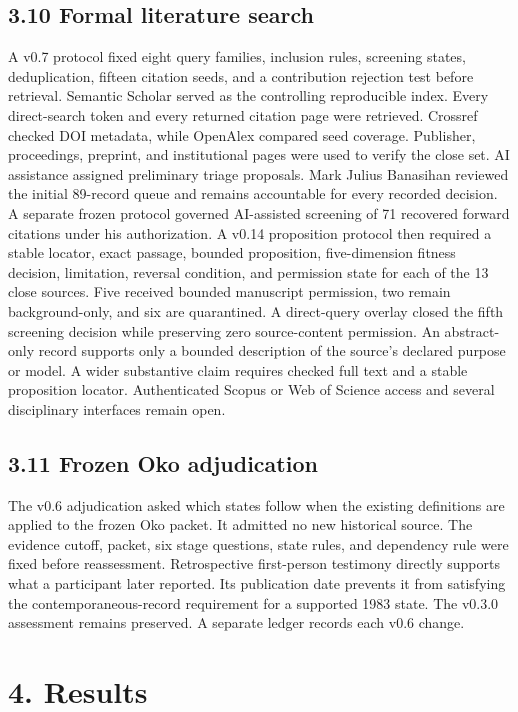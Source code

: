 \documentclass[11pt]{article}
\begin{document}
\subsection*{3.10 Formal literature search}
A v0.7 protocol fixed eight query families, inclusion rules, screening states, deduplication, fifteen citation seeds, and a contribution rejection test before retrieval. Semantic Scholar served as the controlling reproducible index. Every direct-search token and every returned citation page were retrieved. Crossref checked DOI metadata, while OpenAlex compared seed coverage. Publisher, proceedings, preprint, and institutional pages were used to verify the close set.
AI assistance assigned preliminary triage proposals. Mark Julius Banasihan reviewed the initial 89-record queue and remains accountable for every recorded decision. A separate frozen protocol governed AI-assisted screening of 71 recovered forward citations under his authorization. A v0.14 proposition protocol then required a stable locator, exact passage, bounded proposition, five-dimension fitness decision, limitation, reversal condition, and permission state for each of the 13 close sources. Five received bounded manuscript permission, two remain background-only, and six are quarantined. A direct-query overlay closed the fifth screening decision while preserving zero source-content permission. An abstract-only record supports only a bounded description of the source's declared purpose or model. A wider substantive claim requires checked full text and a stable proposition locator. Authenticated Scopus or Web of Science access and several disciplinary interfaces remain open.
\subsection*{3.11 Frozen Oko adjudication}
The v0.6 adjudication asked which states follow when the existing definitions are applied to the frozen Oko packet. It admitted no new historical source. The evidence cutoff, packet, six stage questions, state rules, and dependency rule were fixed before reassessment. Retrospective first-person testimony directly supports what a participant later reported. Its publication date prevents it from satisfying the contemporaneous-record requirement for a supported 1983 state. The v0.3.0 assessment remains preserved. A separate ledger records each v0.6 change.
\FloatBarrier
\section*{4. Results}
\end{document}

